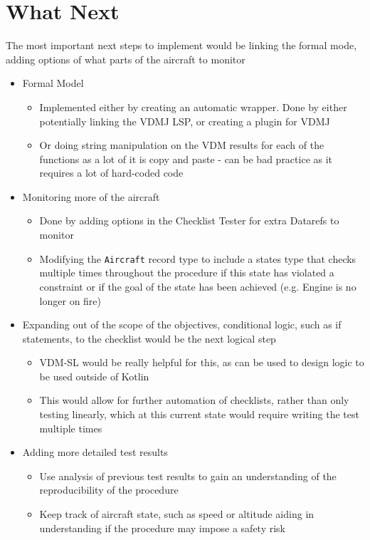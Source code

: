 \documentclass[../dissertation.tex]{subfiles}
\begin{document}
\section{What Next}
The most important next steps to implement would be
linking the formal mode, adding options of what parts of the aircraft
to monitor

\begin{itemize}
  \item Formal Model
  \begin{itemize}
    \item Implemented either by creating an automatic wrapper.
      Done by either potentially linking the VDMJ LSP, or creating a
      plugin for VDMJ
    \item Or doing string manipulation on the VDM results for each of the
      functions as a lot of it is copy and paste - can be bad practice as
      it requires a lot of hard-coded code
  \end{itemize}
  \item Monitoring more of the aircraft
  \begin{itemize}
    \item Done by adding options in the Checklist Tester for extra
      Datarefs to monitor
    \item Modifying the \lstinline|Aircraft| record type to include a
      states type that checks multiple times throughout the procedure
      if this state has violated a constraint or if the goal of the
      state has been achieved (e.g. Engine is no longer on fire)
  \end{itemize}
  \item Expanding out of the scope of the objectives,
    conditional logic, such as if statements, to the checklist
    would be the next logical step
  \begin{itemize}
    \item VDM-SL would be really helpful for this, as can be used to
      design logic to be used outside of Kotlin
    \item This would allow for further automation of checklists,
      rather than only testing linearly, which at this current state
      would require writing the test multiple times
  \end{itemize}
  \item Adding more detailed test results
  \begin{itemize}
    \item Use analysis of previous test results to gain an understanding
      of the reproducibility of the procedure
    \item Keep track of aircraft state, such as speed or altitude
      aiding in understanding if the procedure may impose a safety risk 
  \end{itemize}
\end{itemize}
\end{document}
